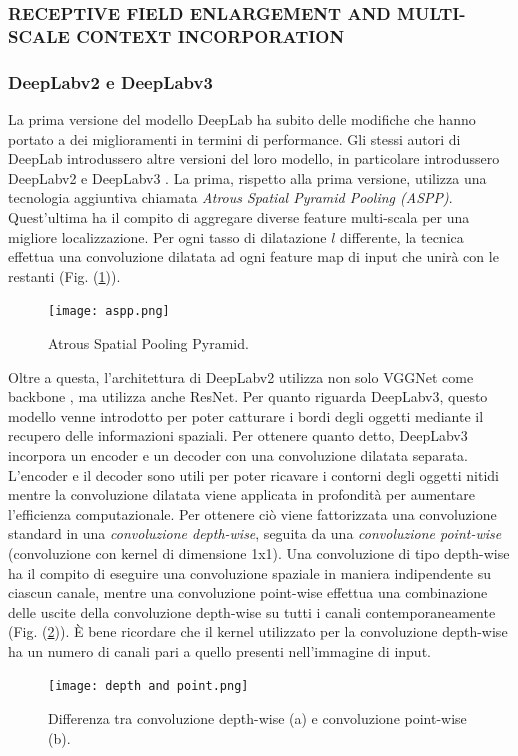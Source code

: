 \subsubsection{RECEPTIVE FIELD ENLARGEMENT AND MULTI-SCALE CONTEXT INCORPORATION}
\subsubsection{DeepLabv2 e DeepLabv3}
La prima versione del modello DeepLab ha subito delle modifiche che hanno 
portato a dei miglioramenti in termini di performance. Gli stessi autori di 
DeepLab introdussero altre versioni del loro modello, in particolare introdussero 
DeepLabv2 \cite{deeplabv2} e DeepLabv3 \cite{deeplabv3}. La prima, rispetto alla prima versione, utilizza 
una tecnologia aggiuntiva chiamata \emph{Atrous Spatial Pyramid Pooling (ASPP)}.  
Quest’ultima ha il compito di aggregare diverse feature multi-scala per una 
migliore localizzazione. Per ogni tasso di dilatazione $l$ differente, la tecnica 
effettua una convoluzione dilatata ad ogni feature map di input che unirà con le 
restanti (Fig. (\ref{aspp})).
\begin{figure}
    \centering
    \texttt{[image: aspp.png]}
    \centering
    \caption{Atrous Spatial Pooling Pyramid.}
    \label{aspp}
\end{figure}
Oltre a questa, l’architettura di DeepLabv2 utilizza non solo VGGNet come 
backbone , ma utilizza anche ResNet. Per quanto riguarda DeepLabv3, questo 
modello venne introdotto per poter catturare i bordi degli oggetti mediante il 
recupero delle informazioni spaziali. Per ottenere quanto detto, DeepLabv3 incorpora 
un encoder e un decoder con una convoluzione dilatata separata. L’encoder 
e il decoder sono utili per poter ricavare i contorni degli oggetti nitidi mentre 
la convoluzione dilatata viene applicata in profondità per aumentare l’efficienza 
computazionale. Per ottenere ciò viene fattorizzata una convoluzione standard in 
una \emph{convoluzione depth-wise}, seguita da una \emph{convoluzione point-wise} (convoluzione 
con kernel di dimensione 1x1). Una convoluzione di tipo depth-wise ha il compito 
di eseguire una convoluzione spaziale in maniera indipendente su ciascun canale, 
mentre una convoluzione point-wise effettua una combinazione delle uscite della 
convoluzione depth-wise su tutti i canali contemporaneamente (Fig. (\ref{depth and point})). È bene ricordare 
che il kernel utilizzato per la convoluzione depth-wise ha un numero di canali pari 
a quello presenti nell’immagine di input.
\begin{figure}
    \centering
    \texttt{[image: depth and point.png]}
    \centering
    \caption{Differenza tra convoluzione depth-wise (a) e convoluzione point-wise (b).}
    \label{depth and point}
\end{figure}

